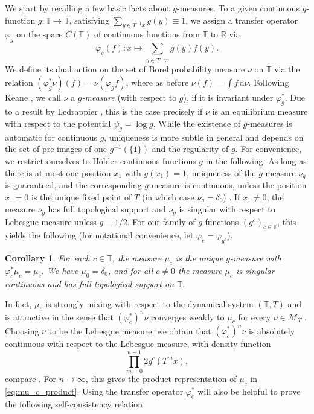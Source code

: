 \documentclass[11pt,reqno]{amsart}
\theoremstyle{plain}
\newtheorem{coro}[theorem]{Corollary}
\theoremstyle{definition}
\newcommand{\R}{{\mathbb R}}
\newcommand{\T}{{\mathbb T}}
\newcommand{\mc}{\mathcal}
\newcommand{\dd}{\,\mathrm{d}}
\newcommand{\TT}{\mathbb{T}}
\begin{document}
 
 We start by recalling a few basic facts about $g$-measures. To a given continuous $g$-function $g \colon \T \to \T$, satisfying $\sum_{y \in T^{-1}x} g(y) \equiv 1$, we assign a transfer operator $\varphi_g$ on the space $C(\T)$ of continuous functions from $\T$ to $\R$ via
\[
\varphi_g(f) \colon x \mapsto \sum_{y \in T^{-1}x} g(y) f(y).
\]
We define its dual action on the set of  Borel probability measure $\nu$ on $\T$ via the relation $(\varphi^{*}_g \nu)(f) = \nu(\varphi_g f)$, where as before $\nu(f) = \int f \dd \nu$. Following Keane \cite{Kea72}, we call $\nu$ a \emph{$g$-measure} (with respect to $g$), if it is invariant under $\varphi^{*}_g$. Due to a result by Ledrappier \cite{Ledrappier}, this is the case precisely if $\nu$ is an equilibrium measure with respect to the potential $\psi_g = \log g$. While the existence of $g$-measures is automatic for continuous $g$, uniqueness is more subtle in general and depends on the set of pre-images of one
$g^{-1}(\{1\})$  and the regularity of $g$. For convenience, we restrict ourselves to H\"{o}lder continuous functions $g$ in the following. As long as there is at most one position $x_1$ with $g(x_1) = 1$, uniqueness of the $g$-measure $\nu_g$ is guaranteed, and the corresponding $g$-measure is continuous, unless the position $x_1 = 0$ is the unique fixed point of $T$ (in which case $\nu_g = \delta_0$) \cite{ConzeRaugi}. If $x_1 \neq 0$, the measure $\nu_g$ has full topological support \cite[Thm.~4.1]{BCEG} and $\nu_g$ is singular with respect to Lebesgue measure unless $g \equiv 1/2$. 
For our family of $g$-functions $(g^c)_{c \in \T}$, this yields the following (for notational convenience, let $\varphi_c = \varphi_{g^c}$).
\begin{coro}\label{coro: unique g}
For each $c \in \T$, the measure $\mu_c$ is the unique $g$-measure with $\varphi_{c}^{*} \mu_c = \mu_c$. We have $\mu_0 = \delta_0$, and for all $c \neq 0$ the measure $\mu_c$ is singular continuous and has full topological support on $\T$.
\end{coro}


In fact, 
 $\mu_c$ is strongly mixing with respect to the dynamical system $(\TT,T)$ and is attractive in the sense that $(\varphi_{c}^*)^n \nu$ converges weakly to $\mu_c$ for every $\nu \in \mc M_T$ \cite{Kea72}. Choosing $\nu$ to be the Lebesgue measure, we obtain that $(\varphi_c^*)^n \nu$ is absolutely continuous with respect to the Lebesgue measure, with density function
\[
\prod_{m=0}^{n-1} 2 g^{c} (T^m x),
\] 
compare \cite[Prop.~1]{FanLau}.
For $n \to \infty$, this gives the product representation of $\mu_c$ in \eqref{eq:mu_c_product}. Using the transfer operator $\varphi_c^*$ will also be helpful to prove the following self-consistency relation.
\end{document}
